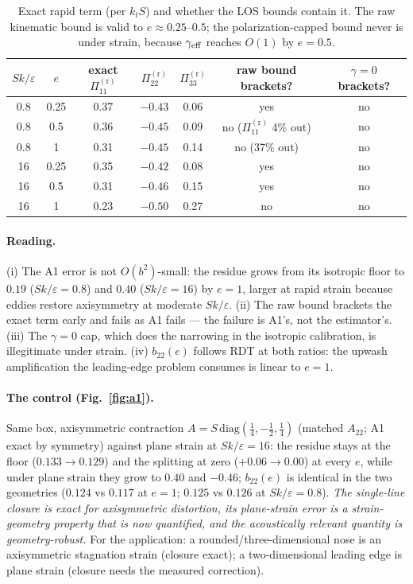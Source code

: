 \documentclass[11pt,a4paper]{article}
\newcommand{\Pir}[1]{\Pi^{(\mathrm r)}_{#1}}
\newcommand{\kt}{k_t}
\newcommand{\Ske}{Sk/\varepsilon}
\begin{document}
\begin{table}[h!]\centering\small
\begin{tabular}{cc|ccc|cc}
\toprule
$\Ske$ & $e$ & exact $\Pir{11}$ & $\Pir{22}$ & $\Pir{33}$ & raw bound brackets? & $\gamma{=}0$ brackets?\\
\midrule
0.8 & 0.25 & 0.37 & $-0.43$ & 0.06 & yes & no\\
0.8 & 0.5  & 0.36 & $-0.45$ & 0.09 & no ($\Pir{11}$ 4\% out) & no\\
0.8 & 1    & 0.31 & $-0.45$ & 0.14 & no (37\% out) & no\\
16  & 0.25 & 0.35 & $-0.42$ & 0.08 & yes & no\\
16  & 0.5  & 0.31 & $-0.46$ & 0.15 & yes & no\\
16  & 1    & 0.23 & $-0.50$ & 0.27 & no & no\\
\bottomrule
\end{tabular}
\caption{Exact rapid term (per $\kt S$) and whether the LOS bounds contain
it. The raw kinematic bound is valid to $e\approx0.25$--$0.5$; the
polarization-capped bound never is under strain, because
$\gamma_{\rm eff}$ reaches $O(1)$ by $e=0.5$.}
\label{tab:bounds}
\end{table}

\paragraph{Reading.} (i) The A1 error is not $O(b^2)$-small: the residue
grows from its isotropic floor to $0.19$ ($\Ske=0.8$) and $0.40$
($\Ske=16$) by $e=1$, larger at rapid strain because eddies restore
axisymmetry at moderate $\Ske$. (ii) The raw bound brackets the exact term
early and fails as A1 fails --- the failure is A1's, not the estimator's.
(iii) The $\gamma=0$ cap, which does the narrowing in the isotropic
calibration, is illegitimate under strain. (iv) $b_{22}(e)$ follows RDT at
both ratios: the upwash amplification the leading-edge problem consumes is
linear to $e=1$.

\paragraph{The control (Fig.~\ref{fig:a1}).} Same box, axisymmetric
contraction $A=S\,\mathrm{diag}(\tfrac14,-\tfrac12,\tfrac14)$ (matched
$A_{22}$; A1 exact by symmetry) against plane strain at $\Ske=16$: the
residue stays at the floor ($0.133\to0.129$) and the splitting at zero
($+0.06\to0.00$) at every $e$, while under plane strain they grow to
$0.40$ and $-0.46$; $b_{22}(e)$ is identical in the two geometries
($0.124$ vs $0.117$ at $e=1$; $0.125$ vs $0.126$ at $\Ske=0.8$).
\emph{The single-line closure is exact for axisymmetric distortion, its
plane-strain error is a strain-geometry property that is now quantified,
and the acoustically relevant quantity is geometry-robust.} For the
application: a rounded/three-dimensional nose is an axisymmetric
stagnation strain (closure exact); a two-dimensional leading edge is plane
strain (closure needs the measured correction).
\end{document}

